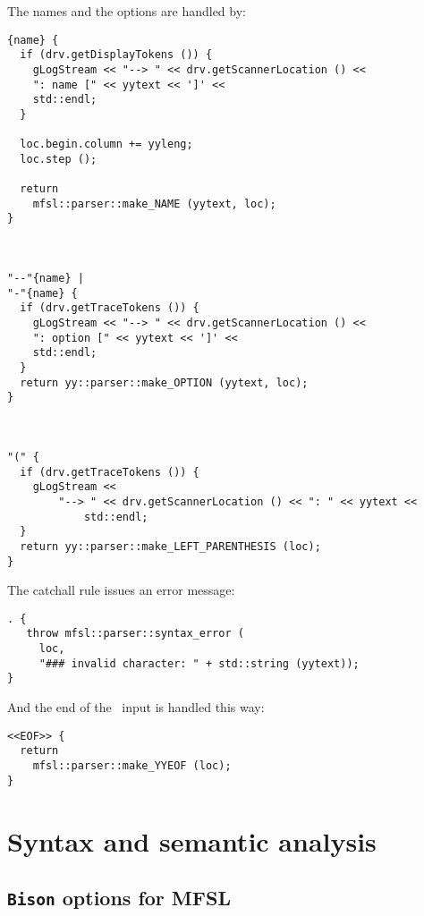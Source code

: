 The names and the options are handled by:
\begin{lstlisting}[language=Flex]
{name} {
  if (drv.getDisplayTokens ()) {
    gLogStream << "--> " << drv.getScannerLocation () <<
    ": name [" << yytext << ']' <<
    std::endl;
  }

  loc.begin.column += yyleng;
  loc.step ();

  return
    mfsl::parser::make_NAME (yytext, loc);
}



"--"{name} |
"-"{name} {
  if (drv.getTraceTokens ()) {
    gLogStream << "--> " << drv.getScannerLocation () <<
    ": option [" << yytext << ']' <<
    std::endl;
  }
  return yy::parser::make_OPTION (yytext, loc);
}



"(" {
  if (drv.getTraceTokens ()) {
    gLogStream <<
    	"--> " << drv.getScannerLocation () << ": " << yytext <<
			std::endl;
  }
  return yy::parser::make_LEFT_PARENTHESIS (loc);
}
\end{lstlisting}

The catchall rule issues an error message:
\begin{lstlisting}[language=Flex]
. {
   throw mfsl::parser::syntax_error (
     loc,
     "### invalid character: " + std::string (yytext));
}
\end{lstlisting}

And the end of the \mfslLang\ input is handled this way:
\begin{lstlisting}[language=Flex]
<<EOF>> {
  return
    mfsl::parser::make_YYEOF (loc);
}
\end{lstlisting}


\section{Syntax and semantic analysis}


\subsection{{\tt Bison} options for MFSL}

